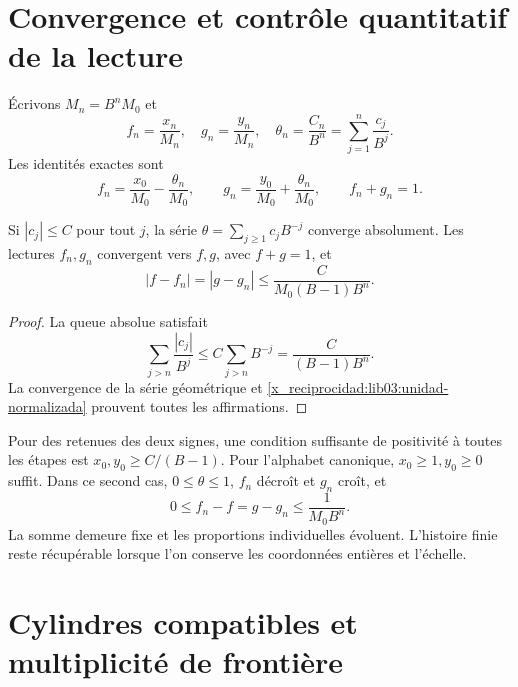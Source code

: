 \section{Convergence et contrôle quantitatif de la lecture}
\label{x_reciprocidad:lib03:limite}

Écrivons \(M_n=B^nM_0\) et
\begin{equation}
 f_n=\frac{x_n}{M_n},\quad g_n=\frac{y_n}{M_n},\quad
 \theta_n=\frac{C_n}{B^n}=\sum_{j=1}^n\frac{c_j}{B^j}.
 \label{x_reciprocidad:lib03:lecturas-normalizadas}
\end{equation}
Les identités exactes sont
\begin{equation}
 f_n=\frac{x_0}{M_0}-\frac{\theta_n}{M_0},\qquad
 g_n=\frac{y_0}{M_0}+\frac{\theta_n}{M_0},\qquad f_n+g_n=1.
 \label{x_reciprocidad:lib03:unidad-normalizada}
\end{equation}

\begin{theorem}
\label{x_reciprocidad:lib03:teo-limite}
Si \(|c_j|\leq C\) pour tout \(j\), la série \(\theta=\sum_{j\geq1}c_jB^{-j}\) converge absolument. Les lectures \(f_n,g_n\) convergent vers \(f,g\), avec \(f+g=1\), et
\begin{equation}
 |f-f_n|=|g-g_n|\leq\frac{C}{M_0(B-1)B^n}.
 \label{x_reciprocidad:lib03:cota-cola}
\end{equation}
\end{theorem}

\begin{proof}
La queue absolue satisfait
\[
 \sum_{j>n}\frac{|c_j|}{B^j}
 \leq C\sum_{j>n}B^{-j}=\frac{C}{(B-1)B^n}.
\]
La convergence de la série géométrique et
\eqref{x_reciprocidad:lib03:unidad-normalizada} prouvent toutes les affirmations.
\end{proof}

Pour des retenues des deux signes, une condition suffisante de positivité
à toutes les étapes est \(x_0,y_0\geq C/(B-1)\). Pour l’alphabet
canonique, \(x_0\geq1,y_0\geq0\) suffit. Dans ce second cas,
\(0\leq\theta\leq1\), \(f_n\) décroît et \(g_n\) croît, et
\begin{equation}
 0\leq f_n-f=g-g_n\leq\frac1{M_0B^n}.
 \label{x_reciprocidad:lib03:cota-canonica}
\end{equation}
La somme demeure fixe et les proportions individuelles évoluent.
L’histoire finie reste récupérable lorsque l’on conserve les
coordonnées entières et l’échelle.

\section{Cylindres compatibles et multiplicité de frontière}
\label{x_reciprocidad:lib03:cilindros}

